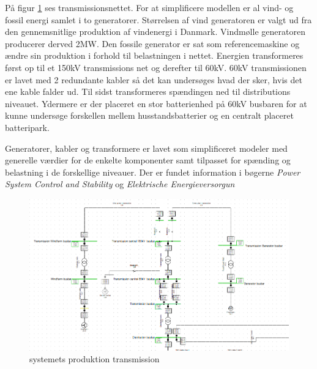 På figur \ref{fig:SimTrans} ses transmissionsnettet. For at simplificere modellen er al vind- og fossil energi samlet i to generatorer. Størrelsen af vind generatoren er valgt ud fra den gennemsnitlige produktion af vindenergi i Danmark. Vindmølle generatoren producerer derved 2MW. Den fossile generator er sat som referencemaskine og ændre sin produktion i forhold til belastningen i nettet. Energien transformeres først op til et 150kV transmissions net og derefter til 60kV. 60kV transmissionen er lavet med 2 redundante kabler så det kan undersøges hvad der sker, hvis det ene kable falder ud. Til sidst transformeres spændingen ned til distributions niveauet. Ydermere er der placeret en stor batterienhed på 60kV busbaren for at kunne undersøge forskellen mellem husstandsbatterier og en centralt placeret batteripark.

Generatorer, kabler og transformere er lavet som simplificeret modeler med generelle værdier for de enkelte komponenter samt tilpasset for spænding og belastning i de forskellige niveauer. Der er fundet information i bøgerne \textit{Power System Control and Stability} og \textit{Elektrische Energieversorgun}
 

\begin{figure}[H] %
	\centering
	\includegraphics[width=1\textwidth]{figurer/Sim_model_1}
	\caption{systemets produktion transmission}
	\label{fig:SimTrans}
\end{figure}
